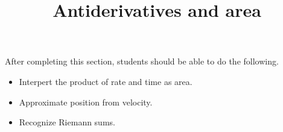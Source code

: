 \documentclass{ximera}
\title{Antiderivatives and area}
\begin{document}
\begin{abstract}
\end{abstract}

\maketitle

\begin{sectionOutcomes}

After completing this section, students should be able to do the following.

\begin{itemize}
\item Interpert the product of rate and time as area.
\item Approximate position from velocity.
\item Recognize Riemann sums.
\end{itemize}

\end{sectionOutcomes}
\end{document}

